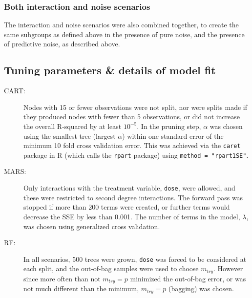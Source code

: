 \documentclass[12pt]{article}
\begin{document}


\subsubsection{Both interaction and noise scenarios} %
\label{ssub:subsubsection_name}

The interaction and noise scenarios were also combined together, to create the same subgroups as defined above in the presence of pure noise, and the presence of predictive noise, as described above.



\subsection{Tuning parameters \& details of model fit} %
\label{ssub:tuning_parameters_for_interaction_scenario}

\begin{description}
  \item [CART:] Nodes with 15 or fewer observations were not split, nor were splits made if they produced nodes with fewer than 5 observations, or did not increase the overall R-squared by at least $10^{-5}$.
  In the pruning step, $\alpha$ was chosen using the smallest tree (largest $\alpha$) within one standard error of the minimum 10 fold cross validation error. This was achieved via the \texttt{caret} package in \textsf{R} (which calls the \texttt{rpart} package) using \texttt{method = "rpart1SE"}.
  \item [MARS:] Only interactions with the treatment variable, \texttt{dose}, were allowed, and these were restricted to second degree interactions. The forward pass was stopped if more than 200 terms were created, or further terms would decrease the SSE by less than 0.001. The number of terms in the model, $\lambda$, was chosen using generalized cross validation. 
  \item [RF:] In all scenarios, 500 trees were grown, \texttt{dose} was forced to be considered at each split, and the out-of-bag samples were used to choose $m_{try}$. However since more often than not $m_{try} = p$ minimized the out-of-bag error, or was not much different than the minimum, $m_{try} = p$ (bagging) was chosen.
\end{description}
\end{document}
